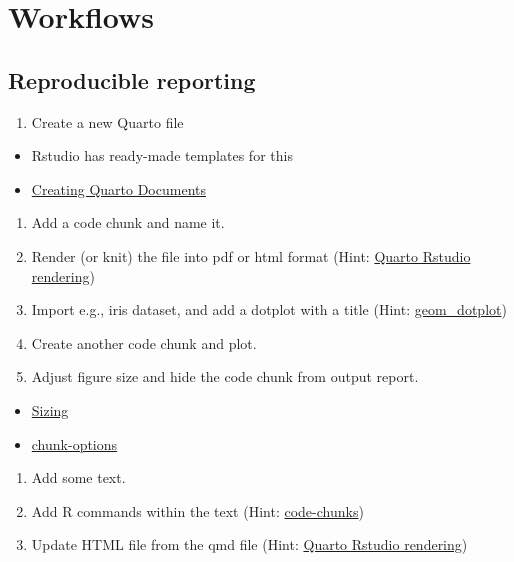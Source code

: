\documentclass[
]{book}
\providecommand{\tightlist}{%
  \setlength{\itemsep}{0pt}\setlength{\parskip}{0pt}}
\begin{document}
\hypertarget{workflows}{%
\section{Workflows}\label{workflows}}

\hypertarget{reproducible-reporting}{%
\subsection{Reproducible reporting}\label{reproducible-reporting}}

\begin{enumerate}
\def\labelenumi{\arabic{enumi}.}
\tightlist
\item
  Create a new Quarto file
\end{enumerate}

\begin{itemize}
\tightlist
\item
  Rstudio has ready-made templates for this
\item
  \href{https://quarto.org/docs/tools/rstudio.html\#creating-documents}{Creating Quarto Documents}
\end{itemize}

\begin{enumerate}
\def\labelenumi{\arabic{enumi}.}
\setcounter{enumi}{1}
\tightlist
\item
  Add a code chunk and name it.
\item
  Render (or knit) the file into pdf or html format (Hint: \href{https://quarto.org/docs/tools/rstudio.html\#render-and-preview}{Quarto Rstudio rendering})
\item
  Import e.g., iris dataset, and add a dotplot with a title (Hint: \href{https://ggplot2.tidyverse.org/reference/geom_dotplot.html}{geom\_dotplot})
\item
  Create another code chunk and plot.
\item
  Adjust figure size and hide the code chunk from output report.
\end{enumerate}

\begin{itemize}
\tightlist
\item
  \href{https://quarto.org/docs/authoring/diagrams.html\#sizing}{Sizing}
\item
  \href{https://quarto.org/docs/computations/r.html\#chunk-options}{chunk-options}
\end{itemize}

\begin{enumerate}
\def\labelenumi{\arabic{enumi}.}
\setcounter{enumi}{6}
\tightlist
\item
  Add some text.
\item
  Add R commands within the text (Hint: \href{https://quarto.org/docs/visual-editor/technical.html\#code-chunks}{code-chunks})
\item
  Update HTML file from the qmd file (Hint: \href{https://quarto.org/docs/tools/rstudio.html\#render-and-preview}{Quarto Rstudio rendering})
\end{enumerate}
\end{document}

